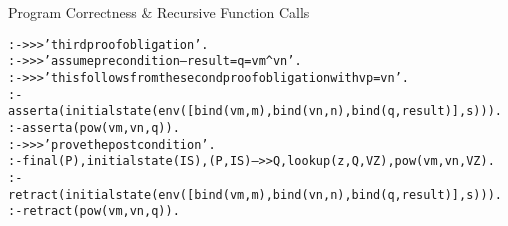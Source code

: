 \documentclass{beamer}
\begin{document}
\begin{frame}[fragile]{Program Correctness \& Recursive Function Calls}
\tiny
\begin{alltt}
:- >>> 'third proof obligation'.
:- >>> 'assume precondition -- result = q = vm^vn'.
:- >>> '   this follows from the second proof obligation with vp = vn'.
:- asserta(initialstate(env([bind(vm,m),bind(vn,n),bind(q,result)],s))).
:- asserta(pow(vm,vn,q)).
:- >>> 'prove the post condition'.
:- final(P),initialstate(IS),(P,IS)-->>Q,lookup(z,Q,VZ),pow(vm,vn,VZ).
:- retract(initialstate(env([bind(vm,m),bind(vn,n),bind(q,result)],s))).
:- retract(pow(vm,vn,q)).
\end{alltt}
\end{frame}
\end{document}
